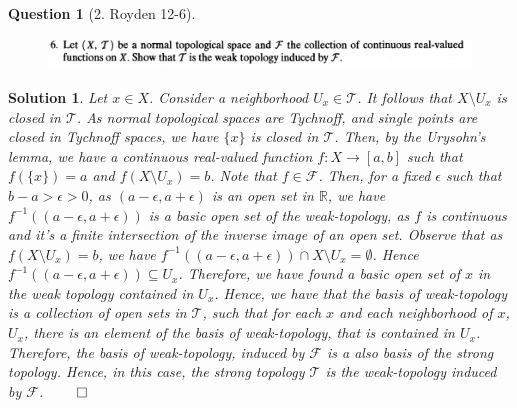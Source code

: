 \documentclass{article} %
\theoremstyle{quest}
\newtheorem*{question}{Question}
\newtheorem*{solution}{Solution}
\begin{document}
\begin{question}[2. Royden 12-6]
\hfill
\begin{figure}[h!]
  \centering
    \includegraphics[width=1\textwidth]{12-6}
\end{figure}
\end{question}
\begin{solution}
Let $x \in X$. Consider a neighborhood $U_x \in \mathscr{T}$. It follows
that $X \setminus U_x$ is closed in $\mathscr{T}$. As normal topological 
spaces are Tychnoff, and single points are closed in Tychnoff spaces, we have
$\{ x\}$ is closed in $\mathscr{T}$. Then, by the Urysohn's lemma, 
we have a continuous real-valued function
$f:X \to [a,b]$ such that $f(\{x\} ) = a$ and
$f(X\setminus U_x ) = b$. Note that $f \in \mathscr{F}$.
Then, for a fixed $\epsilon$ 
such that $b -a > \epsilon > 0$,
as $(a-\epsilon ,a+\epsilon)$ is an open set in $\mathbb{R}$,
we have $f^{-1}((a-\epsilon,a+\epsilon))$
 is a basic open set of the weak-topology,
as $f$ is continuous and it's a finite intersection of the inverse
image of an open set.
Observe that as $f(X \setminus U_x) = b$, we have  
$f^{-1}((a-\epsilon,a+\epsilon)) \cap X \setminus  U_x = \emptyset$. Hence
$f^{-1}((a-\epsilon,a+\epsilon)) \subseteq U_x$. 
Therefore, we have found a basic 
open set of $x$ in the weak topology contained in $U_x$. Hence, we have that
the basis of weak-topology is a collection of open sets in $\mathscr{T}$,
such that for each $x$ and each neighborhood of $x$, $U_x$, there is an
element of the basis of weak-topology, that is contained in $U_x$. Therefore,
the basis of weak-topology, induced by $\mathscr{F}$
 is a also basis of the strong topology. Hence, in this case, the strong
topology $\mathscr{T}$ is the  
weak-topology induced by $\mathscr{F}$. 
\hfill $\qed$


\end{solution}

\bigskip
\end{document}
